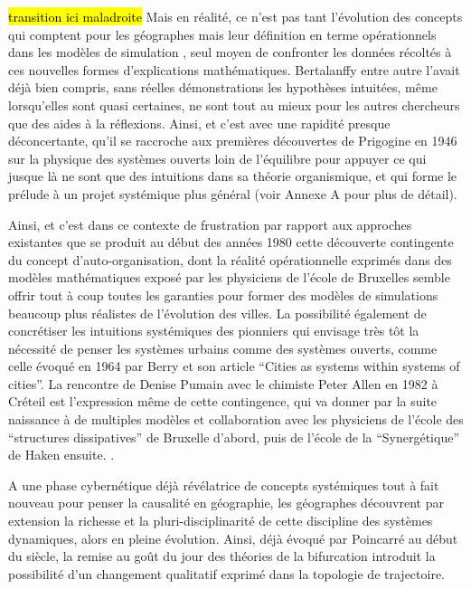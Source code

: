 \hl{transition ici maladroite}
Mais en réalité, ce n'est pas tant l'évolution des concepts qui comptent pour les géographes mais leur définition en terme opérationnels dans les modèles de simulation \autocite{Pumain2003}, seul moyen de confronter les données récoltés à ces nouvelles formes d'explications mathématiques. Bertalanffy entre autre l'avait déjà bien compris, sans réelles démonstrations les hypothèses intuitées, même lorsqu'elles sont quasi certaines, ne sont tout au mieux pour les autres chercheurs que des aides à la réflexions. Ainsi, et c'est avec une rapidité presque déconcertante, qu'il se raccroche aux premières découvertes de Prigogine en 1946 sur la physique des systèmes ouverts loin de l'équilibre pour appuyer ce qui jusque là ne sont que des intuitions dans sa théorie organismique, et qui forme le prélude à un projet systémique plus général (voir Annexe A pour plus de détail).

Ainsi, et c'est dans ce contexte de frustration par rapport aux approches existantes  que se produit au début des années 1980 cette découverte contingente du concept d'auto-organisation, dont la réalité opérationnelle exprimés dans des modèles mathématiques exposé par les physiciens de l'école de Bruxelles semble offrir tout à coup toutes les garanties pour former des modèles de simulations beaucoup plus réalistes de l'évolution des villes.  \autocite[350]{Pumain1998a} La possibilité également de concrétiser les intuitions systémiques des pionniers qui envisage très tôt la nécessité de penser les systèmes urbains comme des systèmes ouverts, comme celle évoqué en 1964 par Berry et son article \enquote{Cities as systems within systems of cities}. La rencontre de Denise Pumain avec le chimiste  Peter Allen en 1982 à Créteil  est l'expression même de cette contingence, qui va donner par la suite naissance à de multiples modèles et collaboration avec les physiciens de l'école des \enquote{structures dissipatives} de Bruxelle d'abord, puis de l'école de la \enquote{Synergétique} de Haken ensuite. \autocites[27]{Pumain2003}{Pumain1982b, Schmid2014}. 

A une phase cybernétique déjà révélatrice de concepts systémiques tout à fait nouveau pour penser la causalité en géographie, les géographes découvrent par extension la richesse et la pluri-disciplinarité de cette discipline des systèmes dynamiques, alors en pleine évolution. Ainsi, déjà évoqué par Poincarré au début du siècle, la remise au goût du jour des théories de la bifurcation introduit la possibilité d'un changement qualitatif exprimé dans la topologie de trajectoire. 

